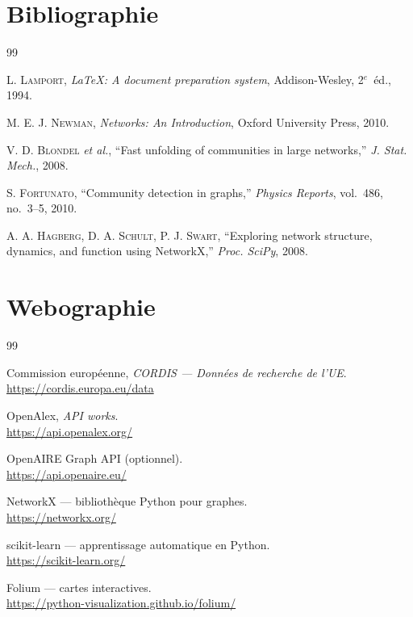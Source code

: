 \documentclass[12pt,a4paper,oneside]{article}
\begin{document}
\clearpage
\section*{Bibliographie}
\renewcommand{\refname}{}
\begin{thebibliography}{99}

L. \textsc{Lamport}, \textit{\LaTeX: A document preparation system}, Addison-Wesley, 2$^e$~éd., 1994.

M. E. J. \textsc{Newman}, \textit{Networks: An Introduction}, Oxford University Press, 2010.

V. D. \textsc{Blondel} \emph{et al.}, ``Fast unfolding of communities in large networks,'' \textit{J. Stat. Mech.}, 2008.

S. \textsc{Fortunato}, ``Community detection in graphs,'' \textit{Physics Reports}, vol.~486, no.~3--5, 2010.

A. A. \textsc{Hagberg}, D. A. \textsc{Schult}, P. J. \textsc{Swart}, ``Exploring network structure, dynamics, and function using NetworkX,'' \textit{Proc. SciPy}, 2008.

\end{thebibliography}

\clearpage
\setcounter{section}{10}
\section{Webographie}
\begin{thebibliography}{99}

Commission européenne, \textit{CORDIS — Données de recherche de l'UE}.\\
\url{https://cordis.europa.eu/data}

OpenAlex, \textit{API works}.\\
\url{https://api.openalex.org/}

OpenAIRE Graph API (optionnel).\\
\url{https://api.openaire.eu/}

NetworkX — bibliothèque Python pour graphes.\\
\url{https://networkx.org/}

scikit-learn — apprentissage automatique en Python.\\
\url{https://scikit-learn.org/}

Folium — cartes interactives.\\
\url{https://python-visualization.github.io/folium/}

\end{thebibliography}
\end{document}
